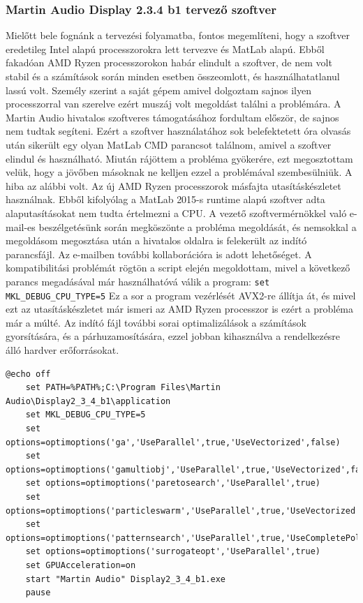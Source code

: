 \subsubsection{Martin Audio Display 2.3.4 b1 tervező szoftver \cite{DISPLAY23USERGUIDE}}
Mielőtt bele fognánk a tervezési folyamatba, fontos megemlíteni, hogy a szoftver
eredetileg Intel alapú processzorokra lett tervezve és MatLab alapú. Ebből fakadóan
AMD Ryzen processzorokon habár elindult a szoftver, de nem volt stabil és a számítások során
minden esetben összeomlott, és használhatatlanul lassú volt. Személy szerint a saját gépem amivel dolgoztam
sajnos ilyen processzorral van szerelve ezért muszáj volt megoldást találni a problémára.
A Martin Audio hivatalos szoftveres támogatásához fordultam először, de sajnos nem tudtak segíteni.
Ezért a szoftver használatához
sok belefektetett óra olvasás után sikerült egy olyan MatLab CMD parancsot találnom, amivel
a szoftver elindul és használható.
Miután rájöttem a probléma gyökerére, ezt megosztottam velük, hogy a jövőben másoknak ne kelljen
ezzel a problémával szembesülniük.
A hiba az alábbi volt. Az új AMD Ryzen processzorok másfajta utasításkészletet használnak.
Ebből kifolyólag a MatLab 2015-s runtime alapú szoftver adta alaputasításokat nem tudta értelmezni a CPU.
A vezető szoftvermérnökkel való e-mail-es beszélgetésünk során megköszönte a probléma
megoldását, és nemsokkal a megoldásom megosztása után a hivatalos oldalra is felekerült
az indító parancsfájl. Az e-mailben további kollaborációra is adott lehetőséget.
A kompatibilitási problémát rögtön a script elején megoldottam,
mivel a következő parancs megadásával már használhatóvá válik a program: \texttt{set MKL\_DEBUG\_CPU\_TYPE=5} \newline
Ez a sor a program vezérlését AVX2-re állítja át, és mivel ezt az utasításkészletet már ismeri az AMD Ryzen processzor
is ezért a probléma már a múlté.
Az indító fájl további sorai optimalizálások a számítások gyorsítására, és a párhuzamosítására, ezzel jobban kihasználva
a rendelkezésre álló hardver erőforrásokat.
\begin{lstlisting}[caption={A Display 2.3.4 b1 indító ".bat" scriptje AMD Ryzen processzorokhoz}, label=batcode, xleftmargin=\parindent]
    @echo off
    set PATH=%PATH%;C:\Program Files\Martin Audio\Display2_3_4_b1\application
    set MKL_DEBUG_CPU_TYPE=5
    set options=optimoptions('ga','UseParallel',true,'UseVectorized',false)
    set options=optimoptions('gamultiobj','UseParallel',true,'UseVectorized',false)
    set options=optimoptions('paretosearch','UseParallel',true)
    set options=optimoptions('particleswarm','UseParallel',true,'UseVectorized',false)
    set options=optimoptions('patternsearch','UseParallel',true,'UseCompletePoll',true,'UseVectorized',false)
    set options=optimoptions('surrogateopt','UseParallel',true)
    set GPUAcceleration=on
    start "Martin Audio" Display2_3_4_b1.exe
    pause
\end{lstlisting}
